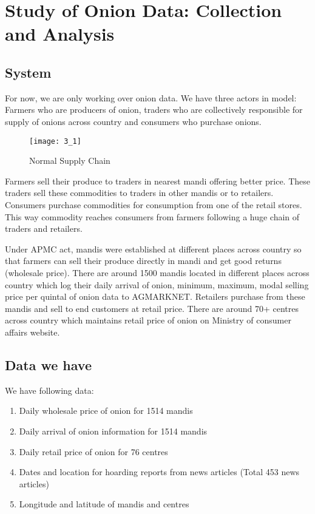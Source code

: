 \chapter{Study of Onion Data: Collection and Analysis}


\section{System}

For now, we are only working over onion data. We have three actors in model: Farmers who are producers of onion, traders who are collectively responsible for supply of onions across country and consumers who purchase onions.

\begin{figure}[h]
\begin{center}    
\texttt{[image: 3\_1]}
\caption{Normal Supply Chain}
\label{fig:Normal Supply Chain}
\end{center}
\end{figure}

Farmers sell their produce to traders in nearest mandi offering better price. These traders sell these commodities to traders in other mandis or to retailers. Consumers purchase commodities for consumption from one of the retail stores. This way commodity reaches consumers from farmers following a huge chain of traders and retailers.

Under APMC act, mandis were established at different places across country so that farmers can sell their produce directly in mandi and get good returns (wholesale price). There are around 1500 mandis located in different places across country which log their daily arrival of onion, minimum, maximum, modal selling price per quintal of onion data to AGMARKNET. Retailers purchase from these mandis and sell to end customers at retail price. There are around 70+ centres across country which maintains retail price of onion on Ministry of consumer affairs website.

\section{Data we have}

We have following data:

\begin{enumerate}

\item Daily wholesale price of onion for 1514 mandis
\item Daily arrival of onion information for 1514 mandis
\item Daily retail price of onion for 76 centres
\item Dates and location for hoarding reports from news articles (Total 453 news articles)
\item Longitude and latitude of mandis and centres

\end{enumerate}

